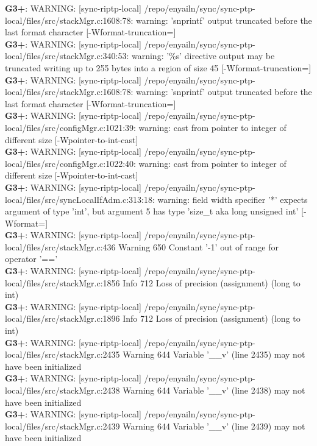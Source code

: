 \documentclass[12pt,twoside]{article}
\begin{document}
\textbf{G3+}: WARNING: [sync-riptp-local] /repo/enyailn/sync/sync-ptp-local/files/src/stackMgr.c:1608:78: warning: 'snprintf' output truncated before the last format character [-Wformat-truncation=]\\ 
\textbf{G3+}: WARNING: [sync-riptp-local] /repo/enyailn/sync/sync-ptp-local/files/src/stackMgr.c:340:53: warning: '\%s' directive output may be truncated writing up to 255 bytes into a region of size 45 [-Wformat-truncation=]\\ 
\textbf{G3+}: WARNING: [sync-riptp-local] /repo/enyailn/sync/sync-ptp-local/files/src/stackMgr.c:1608:78: warning: 'snprintf' output truncated before the last format character [-Wformat-truncation=]\\ 
\textbf{G3+}: WARNING: [sync-riptp-local] /repo/enyailn/sync/sync-ptp-local/files/src/configMgr.c:1021:39: warning: cast from pointer to integer of different size [-Wpointer-to-int-cast]\\ 
\textbf{G3+}: WARNING: [sync-riptp-local] /repo/enyailn/sync/sync-ptp-local/files/src/configMgr.c:1022:40: warning: cast from pointer to integer of different size [-Wpointer-to-int-cast]\\ 
\textbf{G3+}: WARNING: [sync-riptp-local] /repo/enyailn/sync/sync-ptp-local/files/src/syncLocalIfAdm.c:313:18: warning: field width specifier '*' expects argument of type 'int', but argument 5 has type 'size\_t {aka long unsigned int}' [-Wformat=]\\ 
\textbf{G3+}: WARNING: [sync-riptp-local] /repo/enyailn/sync/sync-ptp-local/files/src/stackMgr.c:436 Warning 650 Constant '-1' out of range for operator '=='\\ 
\textbf{G3+}: WARNING: [sync-riptp-local] /repo/enyailn/sync/sync-ptp-local/files/src/stackMgr.c:1856 Info 712 Loss of precision (assignment) (long to int)\\ 
\textbf{G3+}: WARNING: [sync-riptp-local] /repo/enyailn/sync/sync-ptp-local/files/src/stackMgr.c:1896 Info 712 Loss of precision (assignment) (long to int)\\ 
\textbf{G3+}: WARNING: [sync-riptp-local] /repo/enyailn/sync/sync-ptp-local/files/src/stackMgr.c:2435 Warning 644 Variable '\_\_v' (line 2435) may not have been initialized\\ 
\textbf{G3+}: WARNING: [sync-riptp-local] /repo/enyailn/sync/sync-ptp-local/files/src/stackMgr.c:2438 Warning 644 Variable '\_\_v' (line 2438) may not have been initialized\\ 
\textbf{G3+}: WARNING: [sync-riptp-local] /repo/enyailn/sync/sync-ptp-local/files/src/stackMgr.c:2439 Warning 644 Variable '\_\_v' (line 2439) may not have been initialized\\ 
\end{document}
